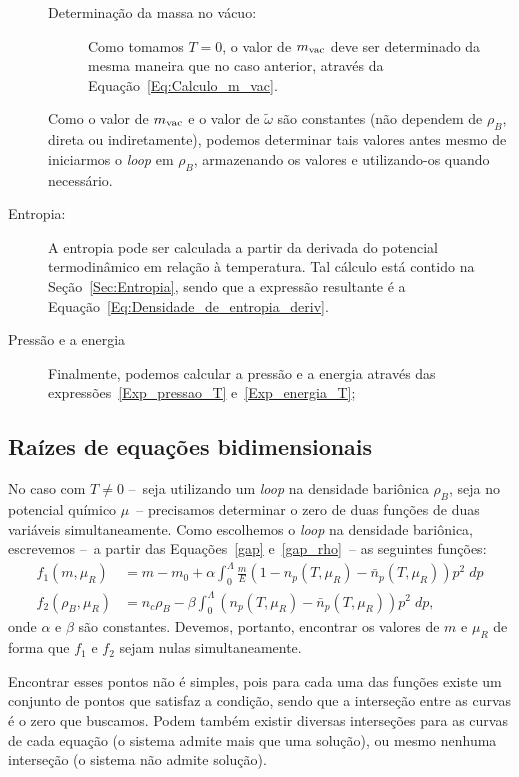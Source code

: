 \begin{description}
\begin{description}
\begin{equation}
				\end{equation}
			\item[Determinação da massa no vácuo:] Como tomamos $T = 0$, o valor de $m_{\rm{vac}}$ deve ser determinado da mesma maneira que no caso anterior, através da Equação~\eqref{Eq:Calculo_m_vac}.
		\end{description}
		Como o valor de $m_{\rm{vac}}$ e o valor de $\tilde\omega$ são constantes (não dependem de $\rho_B$, direta ou indiretamente), podemos determinar tais valores antes mesmo de iniciarmos o \emph{loop} em $\rho_B$, armazenando os valores e utilizando-os quando necessário.
	\item[Entropia:] A entropia pode ser calculada a partir da derivada do potencial termodinâmico em relação à temperatura. Tal cálculo está contido na Seção~\ref{Sec:Entropia}, sendo que a expressão resultante é a Equação~\eqref{Eq:Densidade_de_entropia_deriv}.
	\item[Pressão e a energia] Finalmente, podemos calcular a pressão e a energia através das expressões~\eqref{Exp_pressao_T} e~\eqref{Exp_energia_T};
\end{description}

\subsection{Raízes de equações bidimensionais}

No caso com $T \neq 0$ --~seja utilizando um \emph{loop} na densidade bariônica $\rho_B$, seja no potencial químico $\mu$~-- precisamos determinar o zero de duas funções de duas variáveis simultaneamente. Como escolhemos o \emph{loop} na densidade bariônica, escrevemos --~a partir das Equações~\eqref{gap} e~\eqref{gap_rho}~-- as seguintes funções:
\begin{align}
	f_1(m, \mu_R) &= m - m_0 + \alpha\int_0^\Lambda \frac{m}{E} (1 - n_p(T, \mu_R) - \bar{n}_p(T, \mu_R)) p^2\;dp \\
	f_2(\rho_B, \mu_R) &= n_c\rho_B - \beta \int_0^\Lambda (n_p(T, \mu_R) - \bar{n}_p(T, \mu_R)) p^2\;dp,
\end{align}
%
onde $\alpha$ e $\beta$ são constantes. Devemos, portanto, encontrar os valores de $m$ e $\mu_R$ de forma que $f_1$ e $f_2$ sejam nulas simultaneamente.

Encontrar esses pontos não é simples, pois para cada uma das funções existe um conjunto de pontos que satisfaz a condição, sendo que a interseção entre as curvas é o zero que buscamos. Podem também existir diversas interseções para as curvas de cada equação (o sistema admite mais que uma solução), ou mesmo nenhuma interseção (o sistema não admite solução).

